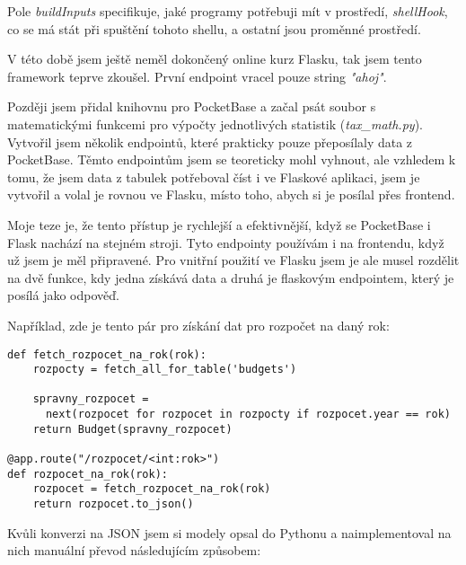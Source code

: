 \documentclass[11pt,a4paper,twoside,openright]{report}
\begin{document}
Pole \emph{buildInputs} specifikuje, jaké programy potřebuji mít v prostředí, \emph{shellHook}, co se má
stát při spuštění tohoto shellu, a ostatní jsou proměnné prostředí.


V této době jsem ještě neměl dokončený online kurz Flasku, tak jsem tento framework teprve zkoušel. První
endpoint vracel pouze string \emph{"ahoj"}.

Později jsem přidal knihovnu pro PocketBase a začal psát soubor s matematickými funkcemi pro výpočty
jednotlivých statistik (\emph{tax\_math.py}). Vytvořil jsem několik endpointů, které prakticky pouze
přeposílaly data z PocketBase. Těmto endpointům jsem se teoreticky mohl vyhnout, ale vzhledem k tomu,
že jsem data z tabulek potřeboval číst i ve Flaskové aplikaci, jsem je vytvořil a volal je rovnou ve
Flasku, místo toho, abych si je posílal přes frontend.

Moje teze je, že tento přístup je rychlejší a efektivnější, když se PocketBase i Flask nachází na stejném
stroji. Tyto endpointy používám i na frontendu, když už jsem je měl připravené. Pro vnitřní použití ve
Flasku jsem je ale musel rozdělit na dvě funkce, kdy jedna získává data a druhá je flaskovým endpointem,
který je posílá jako odpověď.

Například, zde je tento pár pro získání dat pro rozpočet na daný rok:

\begin{verbatim}
def fetch_rozpocet_na_rok(rok):
    rozpocty = fetch_all_for_table('budgets')

    spravny_rozpocet =
      next(rozpocet for rozpocet in rozpocty if rozpocet.year == rok)
    return Budget(spravny_rozpocet)

@app.route("/rozpocet/<int:rok>")
def rozpocet_na_rok(rok):
    rozpocet = fetch_rozpocet_na_rok(rok)
    return rozpocet.to_json()
\end{verbatim}

Kvůli konverzi na JSON jsem si modely opsal do Pythonu a naimplementoval na nich manuální převod
následujícím způsobem:
\end{document}
